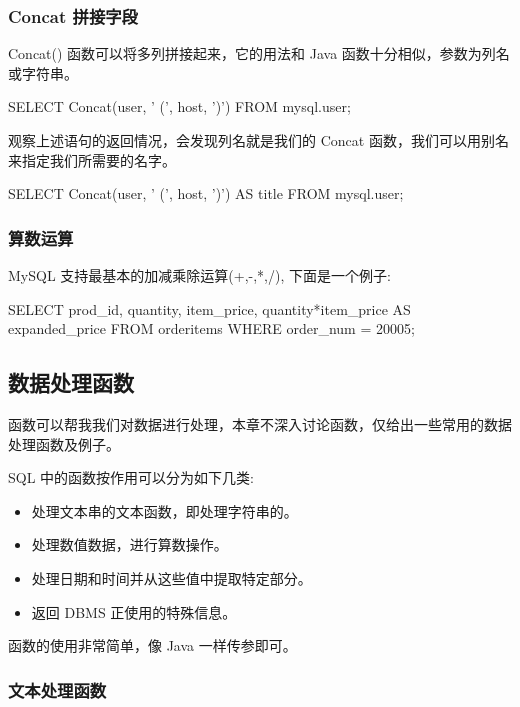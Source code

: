 \subsubsection{Concat 拼接字段}

Concat() 函数可以将多列拼接起来，它的用法和 Java 函数十分相似，参数为列名或字符串。

\begin{sql}
SELECT Concat(user, ' (', host, ')') FROM mysql.user;
\end{sql}

观察上述语句的返回情况，会发现列名就是我们的 Concat 函数，我们可以用别名来指定我们所需要的名字。

\begin{sql}
SELECT Concat(user, ' (', host, ')') AS title
    FROM mysql.user;
\end{sql}

\subsubsection{算数运算}

MySQL 支持最基本的加减乘除运算(+,-,*,/), 下面是一个例子:

\begin{sql}
SELECT prod_id,
    quantity,
    item_price,
    quantity*item_price AS expanded_price
FROM orderitems
WHERE order_num = 20005;
\end{sql}

\subsection{数据处理函数}

函数可以帮我我们对数据进行处理，本章不深入讨论函数，仅给出一些常用的数据处理函数及例子。

SQL 中的函数按作用可以分为如下几类:
\begin{itemize}
    \item 处理文本串的文本函数，即处理字符串的。
    \item 处理数值数据，进行算数操作。
    \item 处理日期和时间并从这些值中提取特定部分。
    \item 返回 DBMS 正使用的特殊信息。
\end{itemize}

函数的使用非常简单，像 Java 一样传参即可。

\subsubsection{文本处理函数}

